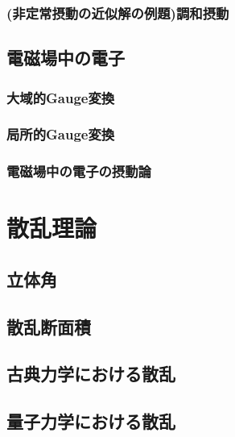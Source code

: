 \documentclass{report}
\begin{document}
      \subsection{(非定常摂動の近似解の例題)調和摂動}
        
    \section{電磁場中の電子}
      
      \subsection{大域的Gauge変換}
        
      \subsection{局所的Gauge変換}
        
      \subsection{電磁場中の電子の摂動論}
        
  \chapter{散乱理論}
    \section{立体角}
      
    \section{散乱断面積}
      
    \section{古典力学における散乱}
      
    \section{量子力学における散乱}
      
\end{document}
